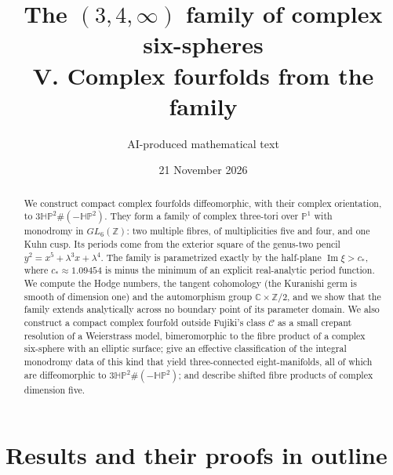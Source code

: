 \documentclass[11pt,a4paper]{article}
\numberwithin{equation}{section}
\theoremstyle{definition}
\begin{document}
\title{The $(3,4,\infty)$ family of complex six-spheres\\[.5em]V. Complex fourfolds from the family}
\author{AI-produced mathematical text}
\date{21 November 2026}
\maketitle
\begin{abstract}
We construct compact complex fourfolds diffeomorphic, with their complex
orientation, to $3\mathbb{HP}^2\#(-\mathbb{HP}^2)$.
They form a family of complex three-tori over $\mathbb P^1$ with
monodromy in $GL_6(\mathbb Z)$: two multiple fibres, of multiplicities
five and four, and one Kuhn cusp. Its periods come from the exterior
square of the genus-two pencil $y^2=x^5+\lambda^3x+\lambda^4$.
The family is parametrized exactly
by the half-plane $\operatorname{Im}\xi>c_*$, where
$c_*\approx1.09454$ is minus the minimum of an explicit real-analytic
period function.  We compute the Hodge numbers, the tangent
cohomology (the Kuranishi germ is smooth of dimension one) and the
automorphism group $\mathbb C\times\mathbb Z/2$, and we show that the
family extends analytically across no boundary point of its parameter
domain.  We also construct a compact complex fourfold outside Fujiki's
class $\mathcal C$ as a small crepant resolution of a Weierstrass model,
bimeromorphic to the fibre product of a complex six-sphere with an
elliptic surface; give an effective
classification of the integral monodromy data of this kind that yield
three-connected eight-manifolds, all of which are diffeomorphic to
$3\mathbb{HP}^2\#(-\mathbb{HP}^2)$; and describe shifted fibre products
of complex dimension five.
\end{abstract}
\clearpage
\tableofcontents
\clearpage
\section{Results and their proofs in outline}\label{sec:results}
\end{document}

